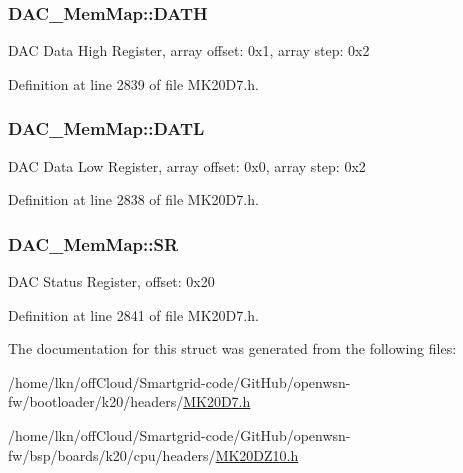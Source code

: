 \subsubsection[{\texorpdfstring{D\+A\+TH}{DATH}}]{ D\+A\+C\+\_\+\+Mem\+Map\+::\+D\+A\+TH}\hypertarget{struct_d_a_c___mem_map_ab05302bfcc5f26e258870c56bbdb52b8}{}\label{struct_d_a_c___mem_map_ab05302bfcc5f26e258870c56bbdb52b8}
D\+AC Data High Register, array offset\+: 0x1, array step\+: 0x2 

Definition at line 2839 of file M\+K20\+D7.\+h.

\subsubsection[{\texorpdfstring{D\+A\+TL}{DATL}}]{ D\+A\+C\+\_\+\+Mem\+Map\+::\+D\+A\+TL}\hypertarget{struct_d_a_c___mem_map_a5e154a0937bc5d4879efb1fd80f713f0}{}\label{struct_d_a_c___mem_map_a5e154a0937bc5d4879efb1fd80f713f0}
D\+AC Data Low Register, array offset\+: 0x0, array step\+: 0x2 

Definition at line 2838 of file M\+K20\+D7.\+h.

\subsubsection[{\texorpdfstring{SR}{SR}}]{ D\+A\+C\+\_\+\+Mem\+Map\+::\+SR}\hypertarget{struct_d_a_c___mem_map_a146115dd60e5e34ce6f1d8dc2b860877}{}\label{struct_d_a_c___mem_map_a146115dd60e5e34ce6f1d8dc2b860877}
D\+AC Status Register, offset\+: 0x20 

Definition at line 2841 of file M\+K20\+D7.\+h.



The documentation for this struct was generated from the following files\+:\begin{DoxyCompactItemize}
\item 
/home/lkn/off\+Cloud/\+Smartgrid-\/code/\+Git\+Hub/openwsn-\/fw/bootloader/k20/headers/\hyperlink{bootloader_2k20_2headers_2_m_k20_d7_8h}{M\+K20\+D7.\+h}\item 
/home/lkn/off\+Cloud/\+Smartgrid-\/code/\+Git\+Hub/openwsn-\/fw/bsp/boards/k20/cpu/headers/\hyperlink{_m_k20_d_z10_8h}{M\+K20\+D\+Z10.\+h}\end{DoxyCompactItemize}
